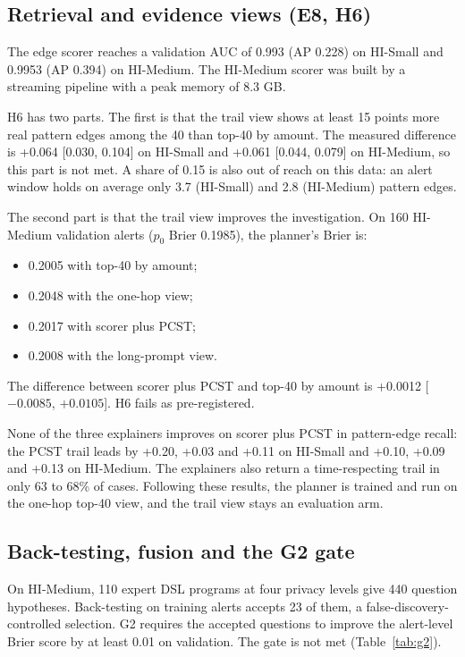 \documentclass[11pt,a4paper]{article}
\begin{document}
\subsection{Retrieval and evidence views (E8, H6)}

The edge scorer reaches a validation AUC of 0.993 (AP 0.228) on HI-Small and 0.9953 (AP 0.394) on HI-Medium. The HI-Medium scorer was built by a streaming pipeline with a peak memory of 8.3 GB.

H6 has two parts. The first is that the trail view shows at least 15 points more real pattern edges among the 40 than top-40 by amount. The measured difference is +0.064 [0.030, 0.104] on HI-Small and +0.061 [0.044, 0.079] on HI-Medium, so this part is not met. A share of 0.15 is also out of reach on this data: an alert window holds on average only 3.7 (HI-Small) and 2.8 (HI-Medium) pattern edges.

The second part is that the trail view improves the investigation. On 160 HI-Medium validation alerts ($p_0$ Brier 0.1985), the planner's Brier is:
\begin{itemize}
\item 0.2005 with top-40 by amount;
\item 0.2048 with the one-hop view;
\item 0.2017 with scorer plus PCST;
\item 0.2008 with the long-prompt view.
\end{itemize}
The difference between scorer plus PCST and top-40 by amount is +0.0012 [$-0.0085$, $+0.0105$]. H6 fails as pre-registered.

None of the three explainers improves on scorer plus PCST in pattern-edge recall: the PCST trail leads by +0.20, +0.03 and +0.11 on HI-Small and +0.10, +0.09 and +0.13 on HI-Medium. The explainers also return a time-respecting trail in only 63 to 68\% of cases. Following these results, the planner is trained and run on the one-hop top-40 view, and the trail view stays an evaluation arm.

\subsection{Back-testing, fusion and the G2 gate}

On HI-Medium, 110 expert DSL programs at four privacy levels give 440 question hypotheses. Back-testing on training alerts accepts 23 of them, a false-discovery-controlled selection. G2 requires the accepted questions to improve the alert-level Brier score by at least 0.01 on validation. The gate is not met (Table~\ref{tab:g2}).
\end{document}
